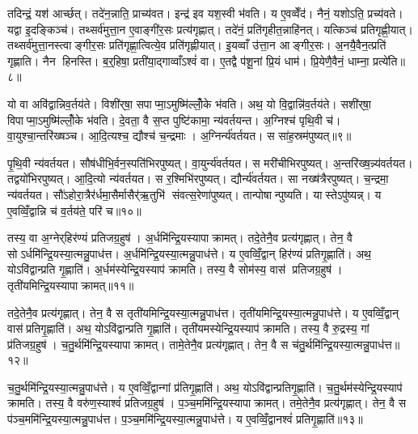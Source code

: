 तदिन्द्रं॒ यश॑ आर्च्छत्। तदे॑न॒न्नाति॒ प्राच्य॑वत। इन्द्र॑ इव यश॒स्वी भ॑वति। य ए॒वव्वेँद॑। नैनं॒ यशोऽति॒ प्रच्य॑वते। यद्वा इ॒दङ्किञ्च॑। तथ्सर्व॑मुत्ता॒न ए॒वाङ्गी॑र॒सः प्रत्य॑गृह्णात्। तदे॑नं॒ प्रति॑गृहीत॒न्नाहि॑नत्। यत्किञ्च॑ प्रतिगृह्णी॒यात्। तथ्सर्व॑मुत्ता॒नस्त्वाङ्गीर॒सः प्रति॑गृह्णा॒त्वित्ये॒व प्रति॑गृह्णीयात्। इ॒यव्वाँ उ॑त्ता॒न आङ्गीर॒सः। अ॒नयै॒वैन॒त्प्रति॑ गृह्णाति। नैन हिनस्ति। ब॒र्॒हिषा॒ प्रती॑या॒द्गाव्वाँऽश्वं॑ वा। ए॒तद्वै प॑शू॒नां प्रि॒यं धाम॑। प्रि॒येणै॒वैनं॒ धाम्ना॒ प्रत्ये॑ति॥८॥\anuvakamend[वि॒ग्राह॑मृ॒तव॒स्तदाऽल॑भ॒तेन्द्र॑ङ्गृह्णीया॒थ्षट्च॑]

यो वा अवि॑द्वान्निव॒र्तय॑ते। विशी॑र्‌षा॒ सपाप्मा॒ऽमुष्मि॑ल्लोँ॒के भ॑वति। अथ॒ यो वि॒द्वान्नि॑व॒र्तय॑ते। सशी॑र्‌षा॒ विपाप्मा॒ऽमुष्मि॑ल्लोँ॒के भ॑वति। दे॒वता॒ वै स॒प्त पुष्टि॑कामा॒ न्य॑वर्तयन्त। अ॒ग्निश्च॑ पृथि॒वी च॑। वा॒युश्चा॒न्तरि॑ख्षञ्च। आ॒दि॒त्यश्च॒ द्यौश्च॑ च॒न्द्रमाः। अ॒ग्निर्न्य॑वर्तयत। स सा॑ह॒स्रम॑पुष्यत्॥९॥

पृ॒थि॒वी न्य॑वर्तयत। सौष॑धीभि॒र्वन॒स्पति॑भिरपुष्यत्। वा॒युर्न्य॑वर्तयत। स मरी॑चीभिरपुष्यत्। अ॒न्तरि॑ख्ष॒न्न्य॑वर्तयत। तद्वयो॑भिरपुष्यत्। आ॒दि॒त्यो न्य॑वर्तयत। स र॒श्मिभि॑रपुष्यत्। द्यौर्न्य॑वर्तयत। सा नख्ष॑त्रैरपुष्यत्। च॒न्द्रमा॒ न्य॑वर्तयत। सौ॑ऽहोरा॒त्रैर॑र्धमा॒सैर्मासैर्॑ऋ॒तुभि॑ संवत्स॒रेणा॑पुष्यत्। तान्पोषान्पुष्यति। यास्तेऽपु॑ष्यन्न्। य ए॒वव्विँ॒द्वान्नि च॑ व॒र्तय॑ते॒ परि॑ च॥१०॥\anuvakamend[अ॒पु॒ष्य॒न्नख्ष॑त्रैरपुष्य॒त्पञ्च॑ च]

तस्य॒ वा अ॒ग्नेर्‌हिर॑ण्यं प्रतिजग्र॒हुष॑। अ॒र्धमि॑न्द्रि॒यस्यापाक्रामत्। तदे॒तेनै॒व प्रत्य॑गृह्णात्। तेन॒ वै सोऽर्धमि॑न्द्रि॒यस्या॒त्मन्नु॒पाध॑त्त। अ॒र्धमि॑न्द्रि॒यस्या॒त्मन्नु॒पाध॑त्ते। य ए॒वव्विँ॒द्वान् हिर॑ण्यं प्रतिगृ॒ह्णाति॑। अथ॒ योऽवि॑द्वान्प्रति गृ॒ह्णाति॑। अ॒र्धम॑स्येन्द्रि॒यस्याप॑ क्रामति। तस्य॒ वै सोम॑स्य॒ वास॑ प्रतिजग्र॒हुष॑। तृती॑यमिन्द्रि॒यस्यापाक्रामत्॥११॥

तदे॒तेनै॒व प्रत्य॑गृह्णात्। तेन॒ वै स तृती॑यमिन्द्रि॒यस्या॒त्मन्नु॒पाध॑त्त। तृती॑यमिन्द्रि॒यस्या॒त्मन्नु॒पाध॑त्ते। य ए॒वव्विँ॒द्वान् वास॑प्रतिगृ॒ह्णाति॑। अथ॒ योऽवि॑द्वान्प्रति गृ॒ह्णाति॑। तृती॑यमस्येन्द्रि॒यस्याप॑ क्रामति। तस्य॒ वै रु॒द्रस्य॒ गां प्र॑तिजग्र॒हुष॑। च॒तु॒र्थमि॑न्द्रि॒यस्यापाक्रामत्। तामे॒तेनै॒व प्रत्य॑गृह्णात्। तेन॒ वै स च॑तु॒र्थमि॑न्द्रि॒यस्या॒त्मन्नु॒पाध॑त्त॥१२॥

च॒तु॒र्थमि॑न्द्रि॒यस्या॒त्मन्नु॒पाध॑त्ते। य ए॒वव्विँ॒द्वान्गां प्र॑तिगृ॒ह्णाति॑। अथ॒ योऽवि॑द्वान्प्रतिगृ॒ह्णाति॑। च॒तु॒र्थम॑स्येन्द्रि॒यस्याप॑ क्रामति। तस्य॒ वै वरु॑ण॒स्याश्वं॑ प्रतिजग्र॒हुष॑। प॒ञ्च॒ममि॑न्द्रि॒यस्यापाक्रामत्। तमे॒तेनै॒व प्रत्य॑गृह्णात्। तेन॒ वै स प॑ञ्च॒ममि॑न्द्रि॒यस्या॒त्मन्नु॒पाध॑त्त। प॒ञ्च॒ममि॑न्द्रि॒यस्या॒त्मन्नु॒पाध॑त्ते। य ए॒वव्विँ॒द्वानश्वं॑ प्रतिगृ॒ह्णाति॑॥१३॥

